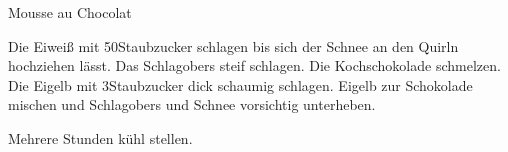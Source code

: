 \begin{recipe}{Mousse au Chocolat}

    \begin{ingredients}
    \end{ingredients}

    \begin{instructions}
        Die Eiweiß mit 50\gram Staubzucker schlagen bis sich der Schnee an den Quirln hochziehen lässt. 
        Das Schlagobers steif schlagen.
        Die Kochschokolade schmelzen.
        Die Eigelb mit 3\el Staubzucker dick schaumig schlagen.
        Eigelb zur Schokolade mischen und Schlagobers und Schnee vorsichtig unterheben.

        Mehrere Stunden kühl stellen.
    \end{instructions}
\end{recipe}
